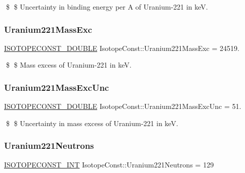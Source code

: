 \$ \$ Uncertainty in binding energy per A of Uranium-\/221 in keV. \mbox{\label{group___isotope_const-_uranium-_u221_ga579a3f15c986067ffcfdb82543884685}} 
\subsubsection{\texorpdfstring{Uranium221\+Mass\+Exc}{Uranium221MassExc}}
{\footnotesize\ttfamily \mbox{\hyperlink{group___isotope_const-_macros_ga8f45a7272ce02c0b4c65c44636ed719a}{I\+S\+O\+T\+O\+P\+E\+C\+O\+N\+S\+T\+\_\+\+D\+O\+U\+B\+LE}} Isotope\+Const\+::\+Uranium221\+Mass\+Exc = 24519.}

\$ \$ Mass excess of Uranium-\/221 in keV. \mbox{\label{group___isotope_const-_uranium-_u221_gab4d9a02942ced5069e0699dd53ae624f}} 
\subsubsection{\texorpdfstring{Uranium221\+Mass\+Exc\+Unc}{Uranium221MassExcUnc}}
{\footnotesize\ttfamily \mbox{\hyperlink{group___isotope_const-_macros_ga8f45a7272ce02c0b4c65c44636ed719a}{I\+S\+O\+T\+O\+P\+E\+C\+O\+N\+S\+T\+\_\+\+D\+O\+U\+B\+LE}} Isotope\+Const\+::\+Uranium221\+Mass\+Exc\+Unc = 51.}

\$ \$ Uncertainty in mass excess of Uranium-\/221 in keV. \mbox{\label{group___isotope_const-_uranium-_u221_ga82e74f3c97650853133a09e4c5b059f5}} 
\subsubsection{\texorpdfstring{Uranium221\+Neutrons}{Uranium221Neutrons}}
{\footnotesize\ttfamily \mbox{\hyperlink{group___isotope_const-_macros_ga5f18360b3e99483a35c32d789e62621c}{I\+S\+O\+T\+O\+P\+E\+C\+O\+N\+S\+T\+\_\+\+I\+NT}} Isotope\+Const\+::\+Uranium221\+Neutrons = 129}

